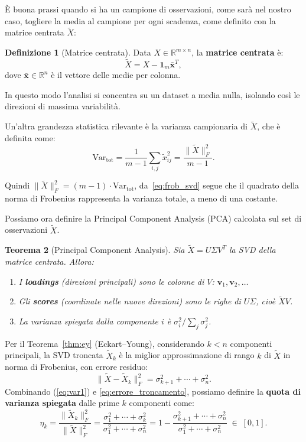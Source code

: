 \documentclass[11pt,a4paper]{article}
\theoremstyle{plain}
\newtheorem{teorema}{Teorema}[section]
\theoremstyle{definition}
\newtheorem{definizione}[teorema]{Definizione}
\theoremstyle{remark}
\begin{document}
È buona prassi quando si ha un campione di osservazioni, come sarà nel nostro caso,
togliere la media al campione per ogni scadenza,
come definito con la matrice centrata $\tilde{X}$:
\begin{definizione}[Matrice centrata]
\label{def:matrice_centrata}
Data $X \in \mathbb{R}^{m \times n}$,
la \textbf{matrice centrata} è:
\[
  \tilde{X} = X - \mathbf{1}_m \bar{\mathbf{x}}^T,
\]
dove $\bar{\mathbf{x}} \in \mathbb{R}^n$ è il vettore delle medie per colonna.
\end{definizione}


In questo modo l'analisi si concentra su un dataset a media nulla, isolando così le direzioni di massima variabilità.

Un'altra grandezza statistica rilevante è la varianza campionaria di $\tilde{X}$, che è definita come:
\begin{equation}
      \text{Var}_{\text{tot}} = \frac{1}{m-1} \sum_{i,j} \tilde{x}_{ij}^2
  = \frac{\|\tilde{X}\|_F^2}{m-1}. \label{eq:var1}
\end{equation}


Quindi $\|\tilde{X}\|_F^2 = (m{-}1) \cdot \text{Var}_{\text{tot}}$, da~\eqref{eq:frob_svd} segue che il quadrato della norma di
Frobenius rappresenta la varianza totale, a meno di una costante.

Possiamo ora definire la Principal Component Analysis (PCA) calcolata sul set di osservazioni $\tilde{X}$.

\begin{teorema}[Principal Component Analysis]
\label{thm:pca}
Sia $\tilde{X} = U \Sigma V^T$ la SVD della matrice centrata. Allora:
\begin{enumerate}
  \item I \textbf{loadings} (direzioni principali) sono le colonne di $V$:
        $\mathbf{v}_1, \mathbf{v}_2, \ldots$
  \item Gli \textbf{scores} (coordinate nelle nuove direzioni) sono le righe
        di $U\Sigma$, cioè $\tilde{X} V$.
  \item La varianza spiegata dalla componente $i$ è
        $\sigma_i^2 / \sum_j \sigma_j^2$.
\end{enumerate}
\end{teorema}

Per il Teorema~\ref{thm:ey} (Eckart--Young), considerando $k < n$ componenti
principali, la SVD troncata $\tilde{X}_k$ è la miglior approssimazione di rango $k$ di $\tilde{X}$
in norma di Frobenius, con errore residuo:
\begin{equation}
  \|\tilde{X} - \tilde{X}_k\|_F^2
  = \sigma_{k+1}^2 + \cdots + \sigma_n^2.
  \label{eq:errore_troncamento}
\end{equation}
Combinando (\ref{eq:var1}) e \eqref{eq:errore_troncamento}, possiamo definire la \textbf{quota di
varianza spiegata} dalle prime $k$ componenti come:
\begin{equation}
  \eta_k
  = \frac{\|\tilde{X}_k\|_F^2}{\|\tilde{X}\|_F^2}
  = \frac{\sigma_1^2 + \cdots + \sigma_k^2}{\sigma_1^2 + \cdots + \sigma_n^2}
  = 1 - \frac{\sigma_{k+1}^2 + \cdots + \sigma_n^2}{\sigma_1^2 + \cdots + \sigma_n^2}
  \;\in\; [0,1].
  \label{eq:varianza_spiegata}
\end{equation}
\end{document}

